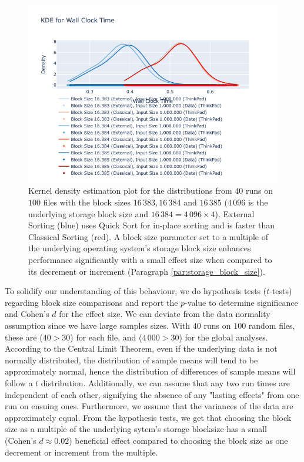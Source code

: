 \documentclass[twocolumn]{article}
\begin{document}
\begin{figure}
    \centering
    \includegraphics[width=0.8 \textwidth]{./res/kde_plot_multiples_block_size.png}
    \caption{Kernel density estimation plot for the distributions from \( 40 \) runs on \( 100 \) files with the block sizes \( 16\,383, 16\,384 \) and \( 16\,385 \) (\(4\,096\) is the underlying storage block size and
        \( 16\,384 = 4\,096 \times 4 \)). External Sorting (blue) uses Quick Sort for in-place sorting and is faster than Classical Sorting (red). A block size parameter set to a multiple of the underlying operating system's storage block size enhances performance significantly with a small effect size when compared to its decrement or increment (Paragraph \ref{par:storage_block_size}).}
    \label{fig:kde_plot_multiples_block_size.png}
\end{figure}

To solidify our understanding of this behaviour, we do hypothesis tests (\( t \)-tests) regarding block size comparisons and report the \( p \)-value to determine significance and Cohen's \( d \) for the effect size.
We can deviate from the data normality assumption since we have large samples sizes.
With \( 40 \) runs on \( 100 \) random files, these are (\(40 > 30 \)) for each file, and (\(4\,000 > 30 \)) for the global analyses.
According to the Central Limit Theorem, even if the underlying data is not normally distributed, the distribution of sample means will tend to be approximately normal, hence the
distribution of differences of sample means will follow a \( t \) distribution.
Additionally, we can assume that any two run times are independent of each other, signifying the absence of any "lasting effects" from one run on ensuing ones.
Furthermore, we assume that the variances of the data are approximately equal. From the hypothesis tests, we get that choosing the block size as a multiple of the underlying sytem's storage blocksize
has a small (Cohen's \( d \approx 0.02 \)) beneficial effect compared to choosing the block size as one decrement or increment from the multiple.
\end{document}

